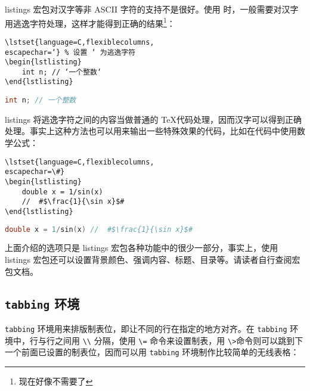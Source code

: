 listings 宏包对汉字等非 ASCII 字符的支持不是很好。使用 \XeLaTeX 时，一般需要对汉字用逃逸字符处理，这样才能得到正确的结果\footnote{现在好像不需要了}：

\begin{minipage}[t]{0.45\textwidth}
\begin{verbatim}
\lstset{language=C,flexiblecolumns,
escapechar=‘} % 设置 ‘ 为逃逸字符
\begin{lstlisting}
    int n; // ‘一个整数‘
\end{lstlisting}
\end{verbatim}
\end{minipage}
\hfill
\begin{minipage}[t]{0.45\textwidth}
    \lstinline[language=C,flexiblecolumns,escapechar=“,keywordstyle = \bfseries,commentstyle=\normalfont]
        {int n; // 一个整数}
\end{minipage}

\vspace{0.2cm}
listings 将逃逸字符之间的内容当做普通的 \TeX 代码处理，因而汉字可以得到正确处理。事实上这种方法也可以用来输出一些特殊效果的代码，比如在代码中使用数学公式：

\begin{minipage}[t]{0.45\textwidth}
\begin{verbatim}
\lstset{language=C,flexiblecolumns,
escapechar=\#}
\begin{lstlisting}
    double x = 1/sin(x) 
    //  #$\frac{1}{\sin x}$#
\end{lstlisting}
\end{verbatim}
\end{minipage}
\hfill
\begin{minipage}[t]{0.45\textwidth}
    \begin{lstlisting}[language=C,flexiblecolumns,escapechar=\#,keywordstyle = \bfseries,commentstyle=\normalfont]
double x = 1/sin(x) //  #$\frac{1}{\sin x}$#
    \end{lstlisting}
\end{minipage}

\vspace{0.2cm}
上面介绍的选项只是 listings 宏包各种功能中的很少一部分，事实上，使用 listings 宏包还可以设置背景颜色、强调内容、标题、目录等。请读者自行查阅宏包文档。

\subsection{\texttt{tabbing} 环境}

\verb|tabbing| 环境用来排版制表位，即让不同的行在指定的地方对齐。在 \verb|tabbing| 环境中，行与行之间用 \verb|\\| 分隔，使用 \verb|\=| 命令来设置制表，用 \verb|\>|命令则可以跳到下一个前面已设置的制表位，因而可以用  \verb|tabbing| 环境制作比较简单的无线表格：

